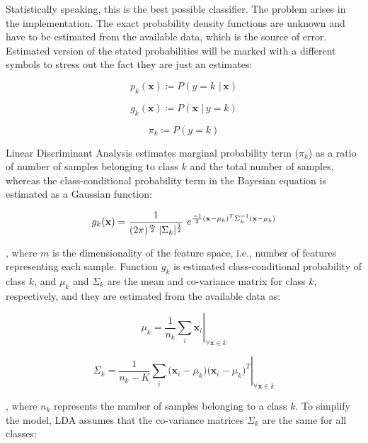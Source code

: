 \documentclass{article}
\begin{document}
Statistically speaking, this is the best possible classifier. The problem arises in the implementation. The exact probability density functions are unknown and have to be estimated from the available data, which is the source of error.
Estimated version of the stated probabilities will be marked with a different symbols to stress out the fact they are just an estimates:

\begin{equation} 
p_k(\mathbf{x}) \coloneqq P(y=k \,\, | \, \mathbf{x})
\end{equation}

\begin{equation} 
g_k(\mathbf{x}) \coloneqq P(\mathbf{x}  \,\, | \, y=k)
\end{equation}

\begin{equation} 
\pi_k \coloneqq P(y=k)
\end{equation}


Linear Discriminant Analysis estimates marginal probability term ($\pi_k$) as a ratio of number of samples belonging to class $k$ and the total  number of samples, whereas the class-conditional probability term in the Bayesian equation is estimated as a Gaussian function:

\begin{equation} 
g_k(\mathbf{x}) = \frac{1}{(2 \pi)^{\nicefrac{m}{2}}\, |\Sigma_k|^{\nicefrac{1}{2}}}\,\, e^{\nicefrac{-1}{2}  (\mathbf{x}-\mu_k)^T  \Sigma_k^{-1} (\mathbf{x}-\mu_k)} 
\end{equation}

\noindent
, where $m$ is the dimensionality of the feature space, i.e., number of features representing each sample. Function $g_k$ is estimated class-conditional probability of class $k$, and $\mu_k$ and $\Sigma_k$ are the mean and co-variance matrix for class $k$, respectively, and they are estimated from the available data as:

\begin{equation}
\left. \mu_k = \frac{1}{n_k} \sum_{i}{\mathbf{x}_i} \right\vert_{\forall \mathbf{x} \in k}
\end{equation}

\begin{equation}
\left. \Sigma_k = \frac{1}{n_k-K} \sum_{i}{\Big( \mathbf{x}_i - \mu_k \Big) \Big( \mathbf{x}_i - \mu_k \Big)^T} \right\vert_{\forall \mathbf{x} \in k}
\end{equation}

 
\noindent
, where $n_k$ represents the number of samples belonging to a class $k$.
To simplify the model, LDA assumes that the co-variance matrices $\Sigma_k$ are the same for all classes:
\end{document}
